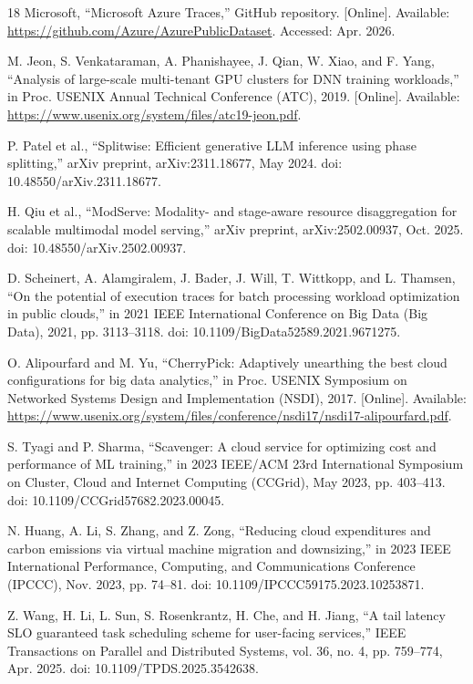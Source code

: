 \documentclass{IEEEtran}
\begin{document}
\begin{thebibliography}{18}
 Microsoft, ``Microsoft Azure Traces,'' GitHub repository. [Online]. Available: \url{https://github.com/Azure/AzurePublicDataset}. Accessed: Apr. 2026.

 M. Jeon, S. Venkataraman, A. Phanishayee, J. Qian, W. Xiao, and F. Yang, ``Analysis of large-scale multi-tenant GPU clusters for DNN training workloads,'' in Proc. USENIX Annual Technical Conference (ATC), 2019. [Online]. Available: \url{https://www.usenix.org/system/files/atc19-jeon.pdf}.

 P. Patel et al., ``Splitwise: Efficient generative LLM inference using phase splitting,'' arXiv preprint, arXiv:2311.18677, May 2024. doi: 10.48550/arXiv.2311.18677.

 H. Qiu et al., ``ModServe: Modality- and stage-aware resource disaggregation for scalable multimodal model serving,'' arXiv preprint, arXiv:2502.00937, Oct. 2025. doi: 10.48550/arXiv.2502.00937.

 D. Scheinert, A. Alamgiralem, J. Bader, J. Will, T. Wittkopp, and L. Thamsen, ``On the potential of execution traces for batch processing workload optimization in public clouds,'' in 2021 IEEE International Conference on Big Data (Big Data), 2021, pp. 3113--3118. doi: 10.1109/BigData52589.2021.9671275.

 O. Alipourfard and M. Yu, ``CherryPick: Adaptively unearthing the best cloud configurations for big data analytics,'' in Proc. USENIX Symposium on Networked Systems Design and Implementation (NSDI), 2017. [Online]. Available: \url{https://www.usenix.org/system/files/conference/nsdi17/nsdi17-alipourfard.pdf}.

 S. Tyagi and P. Sharma, ``Scavenger: A cloud service for optimizing cost and performance of ML training,'' in 2023 IEEE/ACM 23rd International Symposium on Cluster, Cloud and Internet Computing (CCGrid), May 2023, pp. 403--413. doi: 10.1109/CCGrid57682.2023.00045.

 N. Huang, A. Li, S. Zhang, and Z. Zong, ``Reducing cloud expenditures and carbon emissions via virtual machine migration and downsizing,'' in 2023 IEEE International Performance, Computing, and Communications Conference (IPCCC), Nov. 2023, pp. 74--81. doi: 10.1109/IPCCC59175.2023.10253871.

 Z. Wang, H. Li, L. Sun, S. Rosenkrantz, H. Che, and H. Jiang, ``A tail latency SLO guaranteed task scheduling scheme for user-facing services,'' IEEE Transactions on Parallel and Distributed Systems, vol. 36, no. 4, pp. 759--774, Apr. 2025. doi: 10.1109/TPDS.2025.3542638.
\end{thebibliography}
\end{document}
